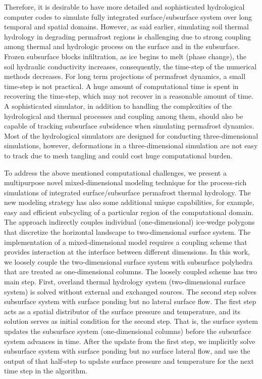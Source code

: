\documentclass[review]{elsarticle}
\begin{document}
Therefore, it is desirable to have more detailed and sophisticated hydrological computer codes to simulate fully integrated surface/subsurface system over long temporal and spatial domains. However, as said earlier, simulating soil thermal hydrology in degrading permafrost regions is challenging due to strong coupling among thermal and hydrologic process on the surface and in the subsurface. Frozen subsurface blocks infiltration, as ice begins to melt (phase change), the soil hydraulic conductivity increases, consequently, the time-step of the numerical methods decreases.  For long term projections of permafrost dynamics, a small time-step is not practical. A huge amount of computational time is spent in recovering the time-step, which may not recover in a reasonable amount of time. A sophisticated simulator, in addition to handling the complexities of the hydrological and thermal processes and coupling among them, should also be capable of  tracking subsurface subsidence when simulating permafrost dynamics. Most of the hydrological simulators are designed for conducting three-dimensional simulations, however, deformations in a three-dimensional simulation are not easy to track due to mesh tangling and could cost huge computational burden.

To address the above mentioned computational challenges, we present a multipurpose novel mixed-dimensional modeling technique for the process-rich simulations of integrated surface/subsurface permafrost thermal hydrology. The new modeling strategy has also some additional unique capabilities, for example, easy and efficient subcycling of a particular region of the computational domain. The approach indirectly couples individual (one-dimensional) ice-wedge polygons that discretize the horizontal landscape to two-dimensional surface system. The implementation of a mixed-dimensional model requires a coupling scheme that provides interaction at the interface between different dimensions. In this work, we loosely couple the two-dimensional surface system with subsurface polyhedra that are treated as one-dimensional columns. The loosely coupled scheme has two main step. First, overland thermal hydrology system (two-dimensional surface system) is solved without external and exchanged sources. The second step solves subsurface system with surface ponding but no lateral surface flow. The first step acts as a spatial distributor of the surface pressure and temperature, and its solution serves as initial condition for the second step. That is, the surface system updates the subsurface system (one-dimensional columns) before the subsurface system advances in time. After the update from the first step, we implicitly solve subsurface system with surface ponding but no surface lateral flow, and use the output of that half-step to update surface pressure and temperature for the next time step in the algorithm. 
\end{document}
